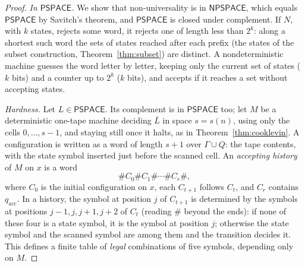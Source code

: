 \begin{proof}
\emph{In $\mathsf{PSPACE}$.} We show that non-universality is in $\mathsf{NPSPACE}$, which equals $\mathsf{PSPACE}$ by Savitch's theorem, and $\mathsf{PSPACE}$ is closed under complement. If $N$, with $k$ states, rejects some word, it rejects one of length less than $2^k$: along a shortest such word the sets of states reached after each prefix (the states of the subset construction, Theorem~\ref{thm:subset}) are distinct. A nondeterministic machine guesses the word letter by letter, keeping only the current set of states ($k$ bits) and a counter up to $2^k$ ($k$ bits), and accepts if it reaches a set without accepting states.

\emph{Hardness.} Let $L\in\mathsf{PSPACE}$. Its complement is in $\mathsf{PSPACE}$ too; let $M$ be a deterministic one-tape machine deciding $\bar L$ in space $s=s(n)$, using only the cells $0,\dots,s-1$, and staying still once it halts, as in Theorem~\ref{thm:cooklevin}. A configuration is written as a word of length $s+1$ over $\Gamma\cup Q$: the tape contents, with the state symbol inserted just before the scanned cell. An \emph{accepting history} of $M$ on $x$ is a word
\[
\#C_0\#C_1\#\cdots\#C_r\#,
\]
where $C_0$ is the initial configuration on $x$, each $C_{t+1}$ follows $C_t$, and $C_r$ contains $q_{\mathrm{acc}}$. In a history, the symbol at position $j$ of $C_{t+1}$ is determined by the symbols at positions $j-1,j,j+1,j+2$ of $C_t$ (reading $\#$ beyond the ends): if none of these four is a state symbol, it is the symbol at position $j$; otherwise the state symbol and the scanned symbol are among them and the transition decides it. This defines a finite table of \emph{legal} combinations of five symbols, depending only on $M$.


\end{proof}

